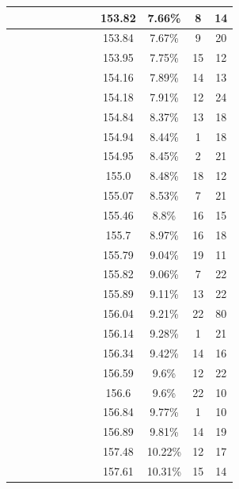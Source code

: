 \begin{center}
\begin{longtable}{|c|c|c|c|c|c|c|c|c|c|c|c|}
 \x &  \x &  \x &  &  &  \x &  \x &  & 153.82 & 7.66\% & 8 & 14 \\ \hline
 \x &  &  \x &  \x &  \x &  &  &  & 153.84 & 7.67\% & 9 & 20 \\ \hline
 \x &  &  &  &  \x &  \x &  &  & 153.95 & 7.75\% & 15 & 12 \\ \hline
 \x &  &  \x &  &  \x &  &  &  & 154.16 & 7.89\% & 14 & 13 \\ \hline
 \x &  \x &  &  \x &  &  &  &  & 154.18 & 7.91\% & 12 & 24 \\ \hline
 \x &  \x &  \x &  \x &  &  &  \x &  & 154.84 & 8.37\% & 13 & 18 \\ \hline
 \x &  &  &  \x &  \x &  \x &  \x &  \x & 154.94 & 8.44\% & 1 & 18 \\ \hline
 \x &  \x &  \x &  \x &  &  &  \x &  \x & 154.95 & 8.45\% & 2 & 21 \\ \hline
 \x &  \x &  &  \x &  &  &  \x &  & 155.0 & 8.48\% & 18 & 12 \\ \hline
 \x &  &  &  &  &  &  &  & 155.07 & 8.53\% & 7 & 21 \\ \hline
 \x &  \x &  \x &  &  \x &  &  \x &  & 155.46 & 8.8\% & 16 & 15 \\ \hline
 \x &  &  \x &  \x &  \x &  &  \x &  & 155.7 & 8.97\% & 16 & 18 \\ \hline
 \x &  \x &  \x &  \x &  \x &  &  &  \x & 155.79 & 9.04\% & 19 & 11 \\ \hline
 \x &  \x &  \x &  &  &  &  \x &  \x & 155.82 & 9.06\% & 7 & 22 \\ \hline
 \x &  &  \x &  \x &  &  &  \x &  \x & 155.89 & 9.11\% & 13 & 22 \\ \hline
 \x &  \x &  &  &  &  &  \x &  & 156.04 & 9.21\% & 22 & 80 \\ \hline
 \x &  &  &  \x &  &  \x &  &  \x & 156.14 & 9.28\% & 1 & 21 \\ \hline
 \x &  \x &  &  &  \x &  &  \x &  \x & 156.34 & 9.42\% & 14 & 16 \\ \hline
 \x &  &  &  \x &  \x &  &  \x &  \x & 156.59 & 9.6\% & 12 & 22 \\ \hline
 \x &  &  &  &  &  \x &  \x &  & 156.6 & 9.6\% & 22 & 10 \\ \hline
 \x &  &  \x &  &  \x &  \x &  \x &  \x & 156.84 & 9.77\% & 1 & 10 \\ \hline
 \x &  &  \x &  &  &  &  \x &  & 156.89 & 9.81\% & 14 & 19 \\ \hline
 \x &  \x &  &  \x &  \x &  &  \x &  \x & 157.48 & 10.22\% & 12 & 17 \\ \hline
 \x &  &  &  \x &  &  &  \x &  & 157.61 & 10.31\% & 15 & 14 \\ \hline

\end{longtable}
\end{center}
